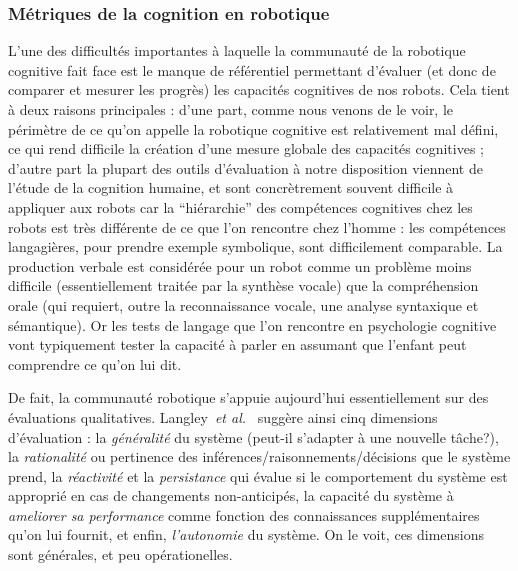 \documentclass[a4paper]{article}
\newcommand{\etal}{{\textit{et al.~}}}
\begin{document}
\subsubsection{Métriques de la cognition en robotique}

L'une des difficultés importantes à laquelle la communauté de la robotique
cognitive fait face est le manque de référentiel permettant d'évaluer (et donc
de comparer et mesurer les progrès) les capacités cognitives de nos robots.
Cela tient à deux raisons principales : d'une part, comme nous venons de le
voir, le périmètre de ce qu'on appelle la robotique cognitive est relativement
mal défini, ce qui rend difficile la création d'une mesure globale des capacités
cognitives ; d'autre part la plupart des outils d'évaluation à notre disposition
viennent de l'étude de la cognition humaine, et sont concrètrement souvent
difficile à appliquer aux robots car la ``hiérarchie'' des compétences
cognitives chez les robots est très différente de ce que l'on rencontre chez
l'homme : les compétences langagières, pour prendre exemple symbolique, sont
difficilement comparable. La production verbale est considérée pour un robot
comme un problème moins difficile (essentiellement traitée par la synthèse
vocale) que la compréhension orale (qui requiert, outre la reconnaissance
vocale, une analyse syntaxique et sémantique). Or les tests de langage que l'on
rencontre en psychologie cognitive vont typiquement tester la capacité à parler
en assumant que l'enfant peut comprendre ce qu'on lui dit.

De fait, la communauté robotique s'appuie aujourd'hui essentiellement sur des
évaluations qualitatives. Langley~\etal\cite{Langley2006} suggère ainsi cinq
dimensions d'évaluation : la \emph{généralité} du système (peut-il s'adapter à
une nouvelle tâche?), la \emph{rationalité} ou pertinence des
inférences/raisonnements/décisions que le système prend, la \emph{réactivité} et
la \emph{persistance} qui évalue si le comportement du système est approprié en
cas de changements non-anticipés, la capacité du système à \emph{ameliorer sa
performance} comme fonction des connaissances supplémentaires qu'on lui fournit,
et enfin, \emph{l'autonomie} du système. On le voit, ces dimensions sont
générales, et peu opérationelles.
\end{document}
